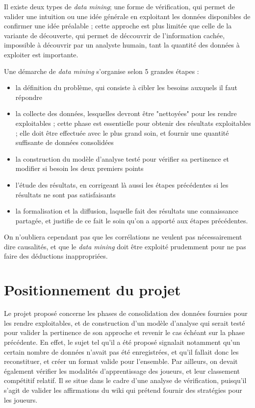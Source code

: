 Il existe deux types de \textit{data mining}; une forme de vérification, qui permet de valider une intuition ou une idée générale en exploitant les données disponibles de confirmer une idée préalable ; cette approche est plus limitée que celle de la variante de découverte, qui permet de déccouvrir de l'information cachée, impossible à découvrir par un analyste humain, tant la quantité des données à exploiter est importante. 

Une démarche de \textit{data mining} s'organise selon 5 grandes étapes : 
\begin{itemize}
\item la définition du problème, qui consiste à cibler les besoins auxquels il faut répondre
\item la collecte des données, lesquelles devront être "nettoyées" pour les rendre exploitables ; cette phase est essentielle pour obtenir des résultats exploitables ; elle doit être effectuée avec le plus grand soin, et fournir une quantité suffisante de données consolidées
\item la construction du modèle d'analyse testé pour vérifier sa pertinence et modifier si besoin les deux premiers points
\item l'étude des résultats, en corrigeant là aussi les étapes précédentes si les résultats ne sont pas satisfaisants
\item la formalisation et la diffusion, laquelle fait des résultats une connaissance partagée, et justifie de ce fait le soin qu'on a apporté aux étapes précédentes. 

\end{itemize}

On n'oubliera cependant pas que les corrélations ne veulent pas nécessairement dire causalités, et que le \textit{data mining} doit être exploité prudemment pour ne pas faire des déductions inappropriées. 



\section{Positionnement du projet}
Le projet proposé concerne les phases de consolidation des données fournies pour les rendre exploitables, et de construction d'un modèle d'analyse qui serait testé pour valider la pertinence de son approche et revenir le cas échéant sur la phase précédente. 
En effet, le sujet tel qu'il a été proposé signalait notamment qu'un certain nombre de données n'avait pas été enregistrées, et qu'il fallait donc les reconstituer, et créer un format valide pour l'ensemble. Par ailleurs, on devait également vérifier les modalités d'apprentissage des joueurs, et leur classement compétitif relatif. 
Il se situe dans le cadre d'une analyse de vérification, puisqu'il s'agit de valider les affirmations du wiki qui prétend fournir des stratégies pour les joueurs. 











